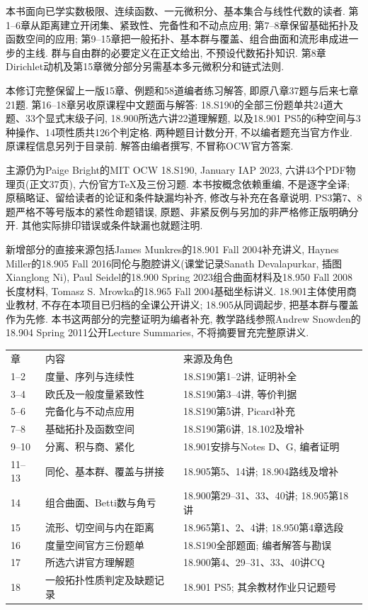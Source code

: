 本书面向已学实数极限、连续函数、一元微积分、基本集合与线性代数的读者. 第1--6章从距离建立开闭集、紧致性、完备性和不动点应用; 第7--8章保留基础拓扑及函数空间的应用; 第9--15章把一般拓扑、基本群与覆盖、组合曲面和流形串成进一步的主线. 群与自由群的必要定义在正文给出, 不预设代数拓扑知识. 第8章Dirichlet动机及第15章微分部分另需基本多元微积分和链式法则.

本修订完整保留上一版15章、例题和58道编者练习解答, 即原八章37题与后来七章21题. 第16--18章另收原课程中文题面与解答: 18.S190的全部三份题单共24道大题、33个显式末级子问, 18.900所选六讲22道理解题, 以及18.901 PS5的6种空间与3种操作、14项性质共126个判定格. 两种题目计数分开, 不以编者题充当官方作业. 原课程信息另列于目录前. 解答由编者撰写, 不冒称OCW官方答案.

主源仍为Paige Bright的MIT OCW 18.S190, January IAP 2023, 六讲43个PDF物理页(正文37页), 六份官方TeX及三份习题. 本书按概念依赖重编, 不是逐字全译; 原稿略证、留给读者的论证和条件缺漏均补齐, 修改与补充在各章说明. PS3第7、8题严格不等号版本的紧性命题错误, 原题、非紧反例与另加的非严格修正版明确分开. 其他实际排印错误或条件缺漏也就题注明.

新增部分的直接来源包括James Munkres的18.901 Fall 2004补充讲义, Haynes Miller的18.905 Fall 2016同伦与胞腔讲义(课堂记录Sanath Devalapurkar, 插图Xianglong Ni), Paul Seidel的18.900 Spring 2023组合曲面材料及18.950 Fall 2008长度材料, Tomasz S. Mrowka的18.965 Fall 2004基础坐标讲义. 18.901主体使用商业教材, 不存在本项目已归档的全课公开讲义; 18.905从同调起步, 把基本群与覆盖作为先修. 本书这两部分的完整证明为编者补充, 教学路线参照Andrew Snowden的18.904 Spring 2011公开Lecture Summaries, 不将摘要冒充完整原讲义.

\begin{center}
\begin{tabular}{p{.09\linewidth}p{.38\linewidth}p{.41\linewidth}}
章 & 内容 & 来源及角色\\
1--2 & 度量、序列与连续性 & 18.S190第1--2讲, 证明补全\\
3--4 & 欧氏及一般度量紧致性 & 18.S190第3--4讲, 等价判据\\
5--6 & 完备化与不动点应用 & 18.S190第5讲, Picard补充\\
7--8 & 基础拓扑及函数空间 & 18.S190第6讲, 18.102及增补\\
9--10 & 分离、积与商、紧化 & 18.901安排与Notes D、G, 编者证明\\
11--13 & 同伦、基本群、覆盖与拼接 & 18.905第5、14讲; 18.904路线及增补\\
14 & 组合曲面、Betti数与角亏 & 18.900第29--31、33、40讲; 18.905第18讲\\
15 & 流形、切空间与内在距离 & 18.965第1、2、4讲; 18.950第4章选段\\
16 & 度量空间官方三份题单 & 18.S190全部题面; 编者解答与勘误\\
17 & 所选六讲官方理解题 & 18.900第4、29--31、33、40讲CQ\\
18 & 一般拓扑性质判定及缺题记录 & 18.901 PS5; 其余教材作业只记题号
\end{tabular}
\end{center}

